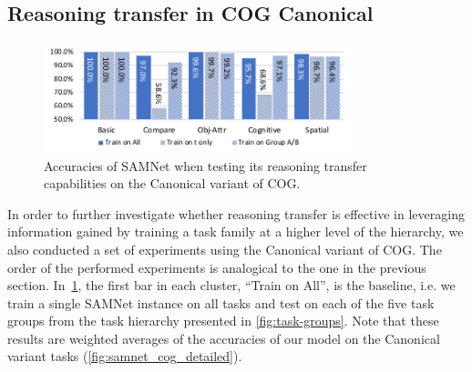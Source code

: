 



\subsection{Reasoning transfer in COG Canonical}
\label{sec:reasoning-transfer-cog}
\begin{figure}[b!]
	\centering
	\includegraphics[width=0.8\textwidth]{figures/cog_reasoning_transfer.pdf}
	\caption{Accuracies of SAMNet when testing its reasoning transfer capabilities on the Canonical variant of COG.}
	\label{fig:cog_reasoning_transfer}
\end{figure}

In order to further investigate whether reasoning transfer is effective in leveraging information gained by training a task family at a higher level of the hierarchy, we also conducted a set of experiments using the Canonical variant of COG.
The order of the performed experiments is analogical to the one in the previous section.
In~\cref{fig:cog_reasoning_transfer}, the first bar in each cluster, ``Train on All'', is the baseline, i.e.
we train a single SAMNet instance on all tasks and test on each of the five task groups from the task hierarchy presented in \cref{fig:task-groups}.
Note that these results are weighted averages of the accuracies of our model on the Canonical variant tasks (\cref{fig:samnet_cog_detailed}).


